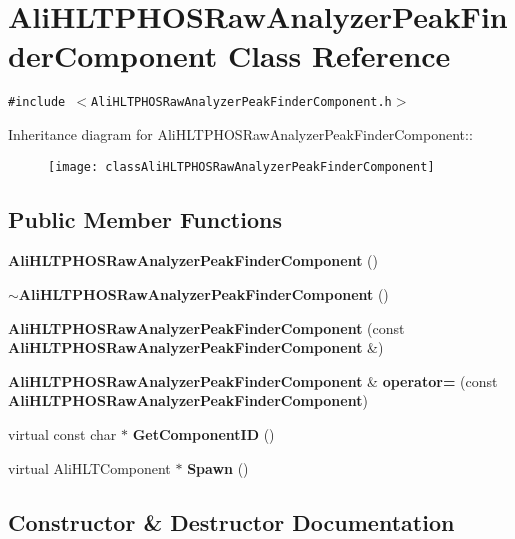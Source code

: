 \section{Ali\-HLTPHOSRaw\-Analyzer\-Peak\-Finder\-Component Class Reference}
\label{classAliHLTPHOSRawAnalyzerPeakFinderComponent}
{\tt \#include $<$Ali\-HLTPHOSRaw\-Analyzer\-Peak\-Finder\-Component.h$>$}

Inheritance diagram for Ali\-HLTPHOSRaw\-Analyzer\-Peak\-Finder\-Component::\begin{figure}[H]
\begin{center}
\leavevmode
\texttt{[image: classAliHLTPHOSRawAnalyzerPeakFinderComponent]}
\end{center}
\end{figure}
\subsection*{Public Member Functions}
\begin{CompactItemize}
\item 
{\bf Ali\-HLTPHOSRaw\-Analyzer\-Peak\-Finder\-Component} ()
\item 
{\bf $\sim$Ali\-HLTPHOSRaw\-Analyzer\-Peak\-Finder\-Component} ()
\item 
{\bf Ali\-HLTPHOSRaw\-Analyzer\-Peak\-Finder\-Component} (const {\bf Ali\-HLTPHOSRaw\-Analyzer\-Peak\-Finder\-Component} \&)
\item 
{\bf Ali\-HLTPHOSRaw\-Analyzer\-Peak\-Finder\-Component} \& {\bf operator=} (const {\bf Ali\-HLTPHOSRaw\-Analyzer\-Peak\-Finder\-Component})
\item 
virtual const char $\ast$ {\bf Get\-Component\-ID} ()
\item 
virtual Ali\-HLTComponent $\ast$ {\bf Spawn} ()
\end{CompactItemize}


\subsection{Constructor \& Destructor Documentation}
